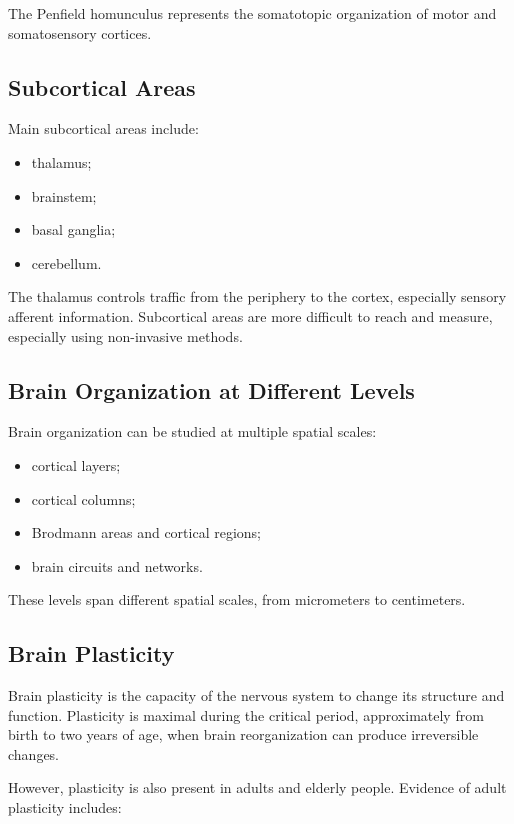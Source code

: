 The Penfield homunculus represents the somatotopic organization of motor and somatosensory cortices.

\subsection{Subcortical Areas}

Main subcortical areas include:

\begin{itemize}[noitemsep]
    \item thalamus;
    \item brainstem;
    \item basal ganglia;
    \item cerebellum.
\end{itemize}

The thalamus controls traffic from the periphery to the cortex, especially sensory afferent information. Subcortical areas are more difficult to reach and measure, especially using non-invasive methods.

\subsection{Brain Organization at Different Levels}

Brain organization can be studied at multiple spatial scales:

\begin{itemize}[noitemsep]
    \item cortical layers;
    \item cortical columns;
    \item Brodmann areas and cortical regions;
    \item brain circuits and networks.
\end{itemize}

These levels span different spatial scales, from micrometers to centimeters.

\subsection{Brain Plasticity}

Brain plasticity is the capacity of the nervous system to change its structure and function. Plasticity is maximal during the critical period, approximately from birth to two years of age, when brain reorganization can produce irreversible changes.

However, plasticity is also present in adults and elderly people. Evidence of adult plasticity includes:

